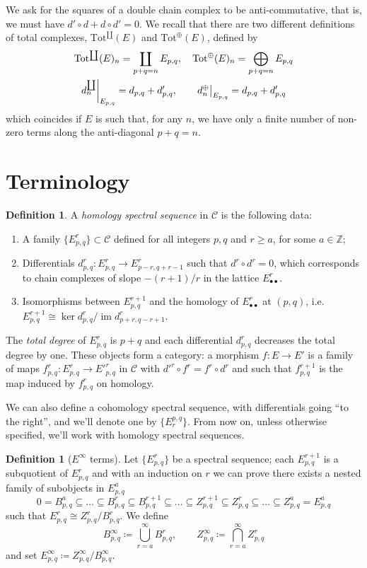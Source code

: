 \documentclass[a4paper]{article}
\newcommand{\Z}{ \mathbb{Z} }
\newcommand{\C}{\mathcal{C}}
\newcommand{\tot}{\textrm{Tot}}
\newcommand{\bb}{\bullet\bullet}
\DeclareMathOperator{\Ima}{im}			%
\newcommand\restr[2]{{%
		\left.\kern-\nulldelimiterspace %
		#1 %
		\vphantom{\big|} %
		\right|_{#2} %
}}
\theoremstyle{plain}
\theoremstyle{definition}
\newtheorem{defn}[thm]{Definition}
\begin{document}
		We ask for the squares of a double chain complex to be anti-commutative, that is, we must have $d'\circ d + d \circ d' = 0$. We recall that there are two different definitions of total complexes, $\tot^{\coprod}(E)$ and $\tot^{\oplus}(E)$, defined by
		\begin{gather*}
			\tot^{\coprod}(E)_n = \coprod_{p+q = n} E_{p,q}, \quad \tot^{\oplus}(E)_n = \bigoplus_{p+q = n} E_{p,q} \\
			\restr{d^{\coprod}_n}{E_{p,q}} = d_{p,q} + d'_{p,q}, \qquad \restr{d^{\oplus}_n}{E_{p,q}} = d_{p,q} + d'_{p,q}
		\end{gather*}
		which coincides if $E$ is such that, for any $n$, we have only a finite number of non-zero terms along the anti-diagonal $p+q = n$.
	\section{Terminology}
		\begin{defn}
			A \emph{homology spectral sequence} in $\C$ is the following data:
			\begin{enumerate}
				\item A family $\{E^r_{p,q}\} \subset \C$ defined for all integers $p, q$ and $r \geq a$, for some $a \in \Z$;
				\item Differentials $d^r_{p,q}\colon E^r_{p,q} \to E^r_{p-r, q+r-1}$ such that $d^r\circ d^r = 0$, which corresponds to chain complexes of slope $-(r+1)/r$ in the lattice $E^r_{\bb}$.
				\item Isomorphisms between $E^{r+1}_{p,q}$ and the homology of $E^r_{\bb}$ at $(p,q)$, i.e.\ $E^{r+1}_{p,q} \cong \ker{d^r_{p,q}}/\Ima{d^r_{p+r, q-r+1}}$.
			\end{enumerate}
			The \emph{total degree} of $E^r_{p,q}$ is $p+q$ and each differential $d^r_{p,q}$ decreases the total degree by one. These objects form a category: a morphism $f\colon E \to E'$ is a family of maps $f_{p,q}^r\colon E^r_{p,q} \to E'^r_{p,q}$ in $\C$ with $d'^r\circ f^r = f^r \circ d^r$ and such that $f^{r+1}_{p,q}$ is the map induced by $f^r_{p,q}$ on homology.
		\end{defn}
		We can also define a cohomology spectral sequence, with differentials going ``to the right'', and we'll denote one by $\{E^{p,q}_r\}$. From now on, unless otherwise specified, we'll work with homology spectral sequences.
		\begin{defn}[$E^{\infty}$ terms]
			Let $\{E^r_{p,q}\}$ be a spectral sequence; each $E^{r+1}_{p,q}$ is a subquotient of $E^r_{p,q}$ and with an induction on $r$ we can prove there exists a nested family of subobjects in $E^a_{p,q}$
			\[
				0 = B^a_{p,q} \subseteq \dots \subseteq B^r_{p,q} \subseteq B^{r+1}_{p,q} \subseteq \dots \subseteq Z^{r+1}_{p,q} \subseteq Z^r_{p,q} \subseteq \dots \subseteq Z^a_{p,q} = E^a_{p,q}
			\]
			such that $E^r_{p,q} \cong Z^r_{p,q}/B^r_{p,q}$. We define
			\[
				B^{\infty}_{p,q} \coloneqq \bigcup_{r=a}^{\infty} B^r_{p,q}, \qquad Z^{\infty}_{p,q} \coloneqq \bigcap_{r=a}^{\infty} Z^r_{p,q}
			\]
			and set $E^{\infty}_{p,q} \coloneqq Z^{\infty}_{p,q}/B^{\infty}_{p,q}$.
		\end{defn}
\end{document}
